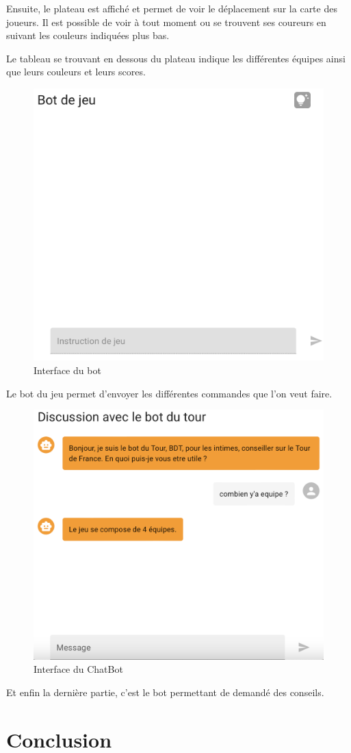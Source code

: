 \documentclass[a4paper, 11pt]{article}
\begin{document}
Ensuite, le plateau est affiché et permet de voir le déplacement sur la carte des joueurs. Il est possible de voir à tout moment ou se trouvent ses coureurs en suivant les couleurs indiquées plus bas.\newline

Le tableau se trouvant en dessous du plateau indique les différentes équipes ainsi que leurs couleurs et leurs scores.

\begin{figure}[!h]
	\centering
	\includegraphics[scale=.5]{assets/interface-2.png}
	\caption{Interface du bot}
\end{figure}

Le bot du jeu permet d'envoyer les différentes commandes que l'on veut faire.

\newpage

\begin{figure}[!h]
	\centering
	\includegraphics[scale=.5]{assets/interface-3.png}
	\caption{Interface du ChatBot}
\end{figure}

Et enfin la dernière partie, c'est le bot permettant de demandé des conseils.

\newpage

\section{Conclusion}
\end{document}

